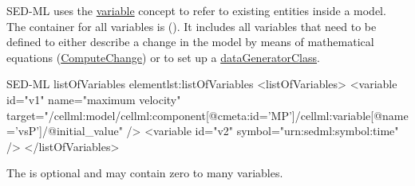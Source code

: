 \label{sec:listOfVariables}

SED-ML uses the \hyperref[class:variable]{variable} concept to refer to existing entities inside a model. The container for all variables is   (). It includes all variables that need to be defined to either describe a change in the model by means of mathematical equations (\hyperref[class:computeChange]{ComputeChange}) or to set up a \hyperref[class:dataGenerator]{dataGeneratorClass}.

%

%
\begin{myXmlLst}{SED-ML listOfVariables element}{lst:listOfVariables}
<listOfVariables>
 <variable id="v1" name="maximum velocity" target="/cellml:model/cellml:component[@cmeta:id='MP']/cellml:variable[@name='vsP']/@initial_value" />
 <variable id="v2" symbol="urn:sedml:symbol:time" />
</listOfVariables>
\end{myXmlLst}
%
 The  is optional and may contain zero to many variables. 
